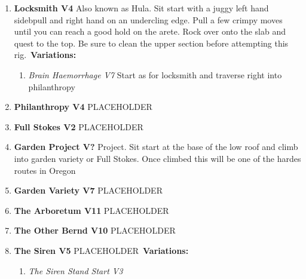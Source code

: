 \begin{enumerate}[resume]
	\item\label{rt:Locksmith} \colorbox{RoyalBlue!20}{\textbf{Locksmith V4     \warn \warn } }
	\newline Also known as Hula. Sit start with a juggy left hand sidebpull and right hand on an undercling edge. Pull a few crimpy moves until you can reach a good hold on the arete. Rock over onto the slab and quest to the top. Be sure to clean the upper section before attempting this rig.\
	\newline \textbf{Variations:}
	\begin{enumerate}
		\item\label{vr:Brain Haemorrhage} \colorbox{Goldenrod!50}{\emph{Brain Haemorrhage V7  }  }
		\newline Start as for locksmith and traverse right into philanthropy\
	\end{enumerate}
	\item\label{rt:Philanthropy} \colorbox{RoyalBlue!20}{\textbf{Philanthropy V4  } }
	\newline PLACEHOLDER\
	\item\label{rt:Full Stokes} \colorbox{green!20}{\textbf{Full Stokes V2  } }
	\newline PLACEHOLDER\
	\item\label{rt:Garden Project} \colorbox{black!20}{\textbf{Garden Project V?  } }
	\newline Project. Sit start at the base of the low roof and climb into garden variety or Full Stokes. Once climbed this will be one of the hardes routes in Oregon\
	\item\label{rt:Garden Variety} \colorbox{Goldenrod!50}{\textbf{Garden Variety V7  } }
	\newline PLACEHOLDER\
	\item\label{rt:The Arboretum} \colorbox{red!20}{\textbf{The Arboretum V11  } }
	\newline PLACEHOLDER\
	\item\label{rt:The Other Bernd} \colorbox{red!20}{\textbf{The Other Bernd V10  } }
	\newline PLACEHOLDER\
	\item\label{rt:The Siren} \colorbox{RoyalBlue!20}{\textbf{The Siren V5     } }
	\newline PLACEHOLDER\
	\newline \textbf{Variations:}
	\begin{enumerate}
		\item\label{vr:The Siren Stand Start} \colorbox{green!20}{\emph{The Siren Stand Start V3    }  }

\end{enumerate}
\end{enumerate}
